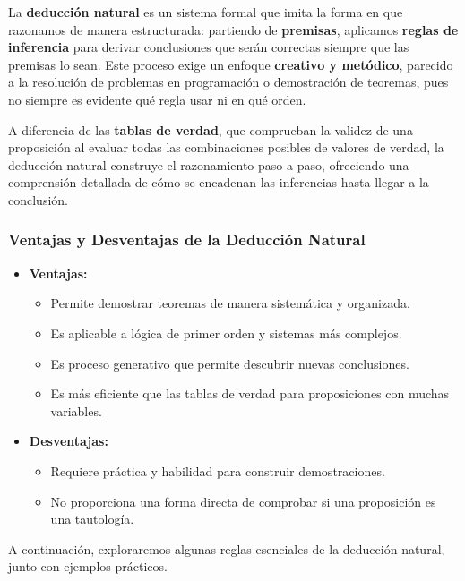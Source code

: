 La \textbf{deducción natural} es un sistema formal que imita la forma en que razonamos de manera estructurada: partiendo de \textbf{premisas}, aplicamos \textbf{reglas de inferencia} para derivar conclusiones que serán correctas siempre que las premisas lo sean. Este proceso exige un enfoque \textbf{creativo y metódico}, parecido a la resolución de problemas en programación o demostración de teoremas, pues no siempre es evidente qué regla usar ni en qué orden. 

A diferencia de las \textbf{tablas de verdad}, que comprueban la validez de una proposición al evaluar todas las combinaciones posibles de valores de verdad, la deducción natural construye el razonamiento paso a paso, ofreciendo una comprensión detallada de cómo se encadenan las inferencias hasta llegar a la conclusión.

\subsubsection*{Ventajas y Desventajas de la Deducción Natural}
\begin{itemize}
    \item \textbf{Ventajas:}
    \begin{itemize}
        \item Permite demostrar teoremas de manera sistemática y organizada.
        \item Es aplicable a lógica de primer orden y sistemas más complejos.
        \item Es proceso generativo que permite descubrir nuevas conclusiones.
        \item Es más eficiente que las tablas de verdad para proposiciones con muchas variables.
    \end{itemize}

    \item \textbf{Desventajas:}
    \begin{itemize}
        \item Requiere práctica y habilidad para construir demostraciones.
        \item No proporciona una forma directa de comprobar si una proposición es una tautología.
    \end{itemize}
\end{itemize}

\bigskip

A continuación, exploraremos algunas reglas esenciales de la deducción natural, junto con ejemplos prácticos.


